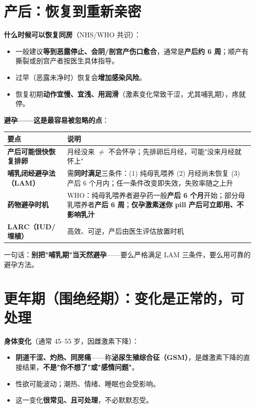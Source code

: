 \documentclass[12pt,UTF8,openany]{ctexbook}
\begin{document}
\section{产后：恢复到重新亲密}

\textbf{什么时候可以恢复同房}（NHS/WHO 共识）：

\begin{itemize}[leftmargin=2em,itemsep=0.3em]
  \item 一般建议\textbf{等到恶露停止、会阴/剖宫产伤口愈合}，通常是\textbf{产后约 6 周}；顺产有撕裂或剖宫产者按医生具体指导。
  \item 过早（恶露未净时）恢复会\textbf{增加感染风险}。
  \item 恢复初期\textbf{动作宜慢、宜浅、用润滑}（激素变化常致干涩，尤其哺乳期），疼就停。
\end{itemize}

\textbf{避孕——这是最容易被忽略的点}：

\begin{tabularx}{\linewidth}{X X}
\toprule
\textbf{要点} & \textbf{说明} \\
\midrule
\textbf{产后可能很快恢复排卵} & 月经没来 $\ne$ 不会怀孕；先排卵后月经，可能"没来月经就怀上" \\
\textbf{哺乳闭经避孕法（LAM）} & 需\textbf{同时满足}三条件：(1) 纯母乳喂养 (2) 月经尚未恢复 (3) 产后 6 个月内；任一条件改变即失效，失败率随之上升 \\
\textbf{药物避孕时机} & WHO：纯母乳喂养者避孕药一般\textbf{产后 6 个月}开始；部分母乳喂养者\textbf{产后 6 周}；\textbf{仅孕激素迷你 pill 产后可立即用、不影响乳汁} \\
\textbf{LARC（IUD/埋植）} & 高效、可逆，产后由医生评估放置时机 \\
\bottomrule
\end{tabularx}

\vspace{0.5em}
\noindent 一句话：\textbf{别把"哺乳期"当天然避孕}——要么严格满足 LAM 三条件，要么用可靠的避孕方法。

\section{更年期（围绝经期）：变化是正常的，可处理}

\textbf{身体变化}（通常 45--55 岁，因雌激素下降）：

\begin{itemize}[leftmargin=2em,itemsep=0.3em]
  \item \textbf{阴道干涩、灼热、同房痛}——称\textbf{泌尿生殖综合征（GSM）}，是雌激素下降的直接结果，\textbf{不是"你不想了"或"感情问题"}。
  \item 性欲可能波动；潮热、情绪、睡眠也会受影响。
  \item 这一变化\textbf{很常见、且可处理}，不必默默忍受。
\end{itemize}
\end{document}
